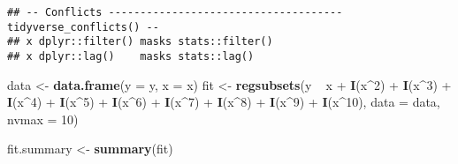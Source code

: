 \documentclass[]{article}
\newenvironment{Shaded}{\begin{snugshade}}{\end{snugshade}}
\newcommand{\KeywordTok}[1]{\textcolor[rgb]{0.13,0.29,0.53}{\textbf{{#1}}}}
\newcommand{\DataTypeTok}[1]{\textcolor[rgb]{0.13,0.29,0.53}{{#1}}}
\newcommand{\DecValTok}[1]{\textcolor[rgb]{0.00,0.00,0.81}{{#1}}}
\newcommand{\StringTok}[1]{\textcolor[rgb]{0.31,0.60,0.02}{{#1}}}
\newcommand{\NormalTok}[1]{{#1}}
\begin{document}
\begin{verbatim}
## -- Conflicts ------------------------------------- tidyverse_conflicts() --
## x dplyr::filter() masks stats::filter()
## x dplyr::lag()    masks stats::lag()
\end{verbatim}

\begin{Shaded}
\begin{Highlighting}[]
\NormalTok{data <-}\StringTok{ }\KeywordTok{data.frame}\NormalTok{(}\DataTypeTok{y =} \NormalTok{y, }\DataTypeTok{x =} \NormalTok{x)}
\NormalTok{fit <-}\StringTok{ }\KeywordTok{regsubsets}\NormalTok{(y ~}\StringTok{ }\NormalTok{x +}\StringTok{ }\KeywordTok{I}\NormalTok{(x^}\DecValTok{2}\NormalTok{) +}\StringTok{ }\KeywordTok{I}\NormalTok{(x^}\DecValTok{3}\NormalTok{) +}\StringTok{ }\KeywordTok{I}\NormalTok{(x^}\DecValTok{4}\NormalTok{) +}\StringTok{ }\KeywordTok{I}\NormalTok{(x^}\DecValTok{5}\NormalTok{) +}\StringTok{ }\KeywordTok{I}\NormalTok{(x^}\DecValTok{6}\NormalTok{) +}\StringTok{ }\KeywordTok{I}\NormalTok{(x^}\DecValTok{7}\NormalTok{) +}\StringTok{ }\KeywordTok{I}\NormalTok{(x^}\DecValTok{8}\NormalTok{) +}\StringTok{ }\KeywordTok{I}\NormalTok{(x^}\DecValTok{9}\NormalTok{) +}\StringTok{ }\KeywordTok{I}\NormalTok{(x^}\DecValTok{10}\NormalTok{), }\DataTypeTok{data =} \NormalTok{data, }\DataTypeTok{nvmax =} \DecValTok{10}\NormalTok{)}

\NormalTok{fit.summary <-}\StringTok{ }\KeywordTok{summary}\NormalTok{(fit)}


\end{Highlighting}
\end{Shaded}
\end{document}
